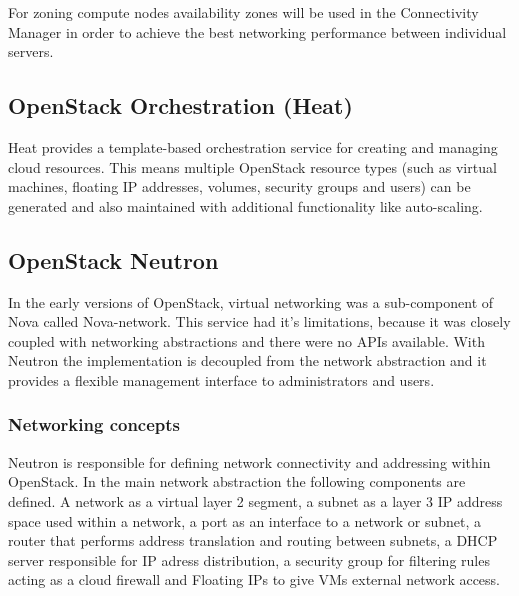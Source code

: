 For zoning compute nodes availability zones will be used in the Connectivity Manager in order to achieve the best networking performance between individual servers.


\subsection{OpenStack Orchestration (Heat)}

Heat provides a template-based orchestration service for creating and managing cloud resources. This means multiple OpenStack resource types (such as virtual machines, floating IP addresses, volumes, security groups and users) can be generated and also maintained with additional functionality like auto-scaling.



\subsection{OpenStack Neutron}

In the early versions of OpenStack, virtual networking was a sub-component of Nova called Nova-network. This service had it's limitations, because it was closely coupled with networking abstractions and there were no APIs available. With Neutron the implementation is decoupled from the network abstraction and it provides a flexible management interface to administrators and users.


\subsubsection{Networking concepts}

Neutron is responsible for defining network connectivity and addressing within OpenStack. In the main network abstraction the following components are defined. A network as a virtual layer 2 segment, a subnet as a layer 3 IP address space used within a network, a port as an interface to a network or subnet, a router that performs address translation and routing between subnets, a DHCP server responsible for IP adress distribution, a security group for filtering rules acting as a cloud firewall and Floating IPs to give VMs external network access.

